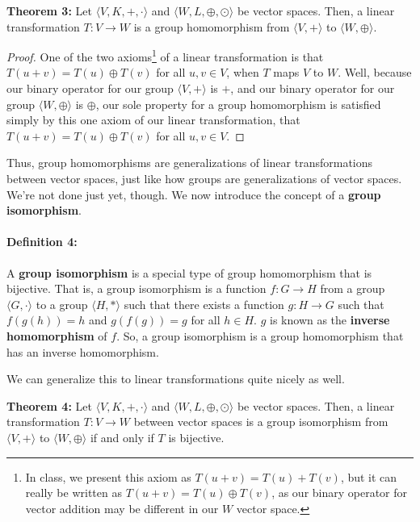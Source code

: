 \documentclass[twoside]{article}
\newcommand{\done}{\renewcommand\qedsymbol{$\blacksquare$}}
\begin{document}
\begin{mdframed}[roundcorner=10pt, backgroundcolor=gray!10]
  \textbf{Theorem 3:} Let $\langle V, K, +, \cdot \rangle$ and
  $\langle W, L, \oplus, \odot \rangle$ be vector spaces. Then, a linear transformation
  $T:V\rightarrow W$ is a group homomorphism from $\langle V, + \rangle$ to $\langle W, \oplus \rangle$.
\end{mdframed}
\begin{proof}
One of the two axioms\footnote[3]{In class, we present this axiom as $T(u+v) = T(u) + T(v)$, but it can really be written as $T(u+v) = T(u) \oplus T(v)$, as our binary operator for vector addition may be different in our $W$ vector space.} of 
a linear transformation is that $T(u+v) = T(u) \oplus T(v)$ for all $u,v \in V$, when $T$
maps $V$ to $W$. Well, because our binary operator for our group $\langle V, + \rangle$ is $+$, and our binary operator for our group $\langle W, \oplus \rangle$ is $\oplus$, 
our sole property for a group homomorphism is satisfied simply by this one axiom 
of our linear transformation, that $T(u+v) = T(u) \oplus T(v)$ for all $u,v \in V$.
\done 
\end{proof}
Thus, group homomorphisms are generalizations of linear transformations between 
vector spaces, just like 
how groups are generalizations of vector spaces. We're not done just yet, though.
We now introduce the concept of a \textbf{group isomorphism}.

\paragraph*{Definition 4:} A \textbf{group isomorphism} is a special type of group homomorphism
that is bijective. That is, a group isomorphism is a function $f:G\rightarrow H$ from a group
$\langle G, \cdot\rangle$ to a group $\langle H, *\rangle$ such that there exists 
a function $g:H\rightarrow G$ such that $f(g(h)) = h$ and $g(f(g)) = g$ for all $h\in H$.
$g$ is known as the \textbf{inverse homomorphism} of $f$. So, a group isomorphism is a
group homomorphism that has an inverse homomorphism.

We can generalize this to linear transformations quite nicely as well.
\begin{mdframed}[roundcorner=10pt, backgroundcolor=gray!10]
  \textbf{Theorem 4:} Let $\langle V, K, +, \cdot \rangle$ and 
  $\langle W, L, \oplus, \odot \rangle$ be vector spaces. Then, a linear transformation
  $T:V\rightarrow W$ between vector spaces is a group isomorphism from $\langle V, + \rangle$ to $\langle W, \oplus \rangle$ if and only if $T$ is bijective.
\end{mdframed}
\end{document}
